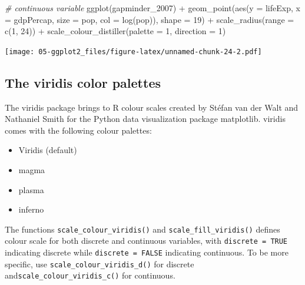 \documentclass[
]{book}
\newenvironment{Shaded}{\begin{snugshade}}{\end{snugshade}}
\newcommand{\AttributeTok}[1]{\textcolor[rgb]{0.77,0.63,0.00}{#1}}
\newcommand{\CommentTok}[1]{\textcolor[rgb]{0.56,0.35,0.01}{\textit{#1}}}
\newcommand{\DecValTok}[1]{\textcolor[rgb]{0.00,0.00,0.81}{#1}}
\newcommand{\FunctionTok}[1]{\textcolor[rgb]{0.00,0.00,0.00}{#1}}
\newcommand{\NormalTok}[1]{#1}
\newcommand{\SpecialCharTok}[1]{\textcolor[rgb]{0.00,0.00,0.00}{#1}}
\providecommand{\tightlist}{%
  \setlength{\itemsep}{0pt}\setlength{\parskip}{0pt}}
\begin{document}
\begin{Shaded}
\begin{Highlighting}[]
\CommentTok{\# continuous variable}
\FunctionTok{ggplot}\NormalTok{(gapminder\_2007) }\SpecialCharTok{+} 
  \FunctionTok{geom\_point}\NormalTok{(}\FunctionTok{aes}\NormalTok{(}\AttributeTok{y =}\NormalTok{ lifeExp, }\AttributeTok{x =}\NormalTok{ gdpPercap, }\AttributeTok{size =}\NormalTok{ pop, }\AttributeTok{col =} \FunctionTok{log}\NormalTok{(pop)), }\AttributeTok{shape =} \DecValTok{19}\NormalTok{) }\SpecialCharTok{+}
  \FunctionTok{scale\_radius}\NormalTok{(}\AttributeTok{range =} \FunctionTok{c}\NormalTok{(}\DecValTok{1}\NormalTok{, }\DecValTok{24}\NormalTok{)) }\SpecialCharTok{+}
  \FunctionTok{scale\_colour\_distiller}\NormalTok{(}\AttributeTok{palette =} \DecValTok{1}\NormalTok{, }\AttributeTok{direction =} \DecValTok{1}\NormalTok{)}
\end{Highlighting}
\end{Shaded}

\texttt{[image: 05-ggplot2\_files/figure-latex/unnamed-chunk-24-2.pdf]}

\hypertarget{the-viridis-color-palettes}{%
\subsection{The viridis color palettes}\label{the-viridis-color-palettes}}

The viridis package brings to R colour scales created by Stéfan van der Walt and Nathaniel Smith for the Python data visualization package matplotlib. viridis comes with the following colour palettes:

\begin{itemize}
\tightlist
\item
  Viridis (default)
\item
  magma
\item
  plasma
\item
  inferno
\end{itemize}

The functions \texttt{scale\_colour\_viridis()} and \texttt{scale\_fill\_viridis()} defines colour scale for both discrete and continuous variables, with \texttt{discrete\ =\ TRUE} indicating discrete while \texttt{discrete\ =\ FALSE} indicating continuous. To be more specific, use \texttt{scale\_colour\_viridis\_d()} for discrete and\texttt{scale\_colour\_viridis\_c()} for continuous.
\end{document}
